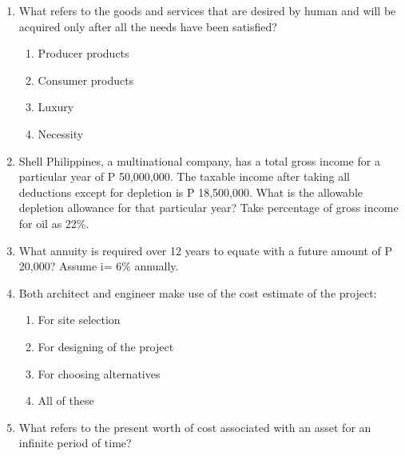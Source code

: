 \documentclass[11pt,a4paper]{article}
\begin{document}
\begin{enumerate}
\item{What refers to the goods and services that are desired by human and will be acquired only after all the needs have been satisfied?}
\begin{enumerate}[label=\Alph*.]
\item{Producer products}
\item{Consumer products}
\item{Luxury}
\item{Necessity}
\end{enumerate}
\item{Shell Philippines, a multinational company, has a total gross income for a particular year of P 50,000,000. The taxable income after taking all deductions except for depletion is P 18,500,000. What is the allowable depletion allowance for that particular year? Take percentage of gross income for oil as 22\%.}
\\
\item{What annuity is required over 12 years to equate with a future amount of P 20,000? Assume i= 6\% annually.}
\\
\item{Both architect and engineer make use of the cost estimate of the project:}
\begin{enumerate}[label=\Alph*.]
\item{For site selection}
\item{For designing of the project}
\item{For choosing alternatives}
\item{All of these}
\end{enumerate}
\item{What refers to the present worth of cost associated with an asset for an infinite period of time?}
\begin{enumerate}[label=\Alph*.]

\end{enumerate}
\end{enumerate}
\end{document}
